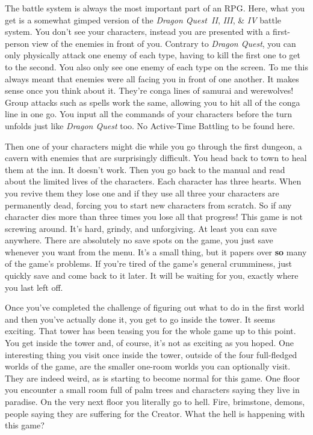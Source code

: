 \documentclass{book}
\begin{document}
The battle system is always the most important part of an RPG. Here, what you get is a somewhat gimped version of the \emph{Dragon Quest~II}, \emph{III}, \& \emph{IV} battle system. You don’t see your characters, instead you are presented with a first-person view of the enemies in front of you. Contrary to \emph{Dragon Quest}, you can only physically attack one enemy of each type, having to kill the first one to get to the second. You also only see one enemy of each type on the screen. To me this always meant that enemies were all facing you in front of one another. It makes sense once you think about it. They’re conga lines of samurai and werewolves! Group attacks such as spells work the same, allowing you to hit all of the conga line in one go. You input all the commands of your characters before the turn unfolds just like \emph{Dragon Quest} too. No Active-Time Battling to be found here.\par
Then one of your characters might die while you go through the first dungeon, a cavern with enemies that are surprisingly difficult. You head back to town to heal them at the inn. It doesn’t work. Then you go back to the manual and read about the limited lives of the characters. Each character has three hearts. When you revive them they lose one and if they use all three your characters are permanently dead, forcing you to start new characters from scratch. So if any character dies more than three times you lose all that progress! This game is not screwing around. It’s hard, grindy, and unforgiving. At least you can save anywhere. There are absolutely no save spots on the game, you just save whenever you want from the menu. It’s a small thing, but it papers over \textbf{so} many of the game’s problems. If you’re tired of the game’s general crumminess, just quickly save and come back to it later. It will be waiting for you, exactly where you last left off.\par
Once you’ve completed the challenge of figuring out what to do in the first world and then you’ve actually done it, you get to go inside the tower. It seems exciting. That tower has been teasing you for the whole game up to this point. You get inside the tower and, of course, it’s not as exciting as you hoped. One interesting thing you visit once inside the tower, outside of the four full-fledged worlds of the game, are the smaller one-room worlds you can optionally visit. They are indeed weird, as is starting to become normal for this game. One floor you encounter a small room full of palm trees and characters saying they live in paradise. On the very next floor you literally go to hell. Fire, brimstone, demons, people saying they are suffering for the Creator. What the hell is happening with this game?\par
\end{document}
